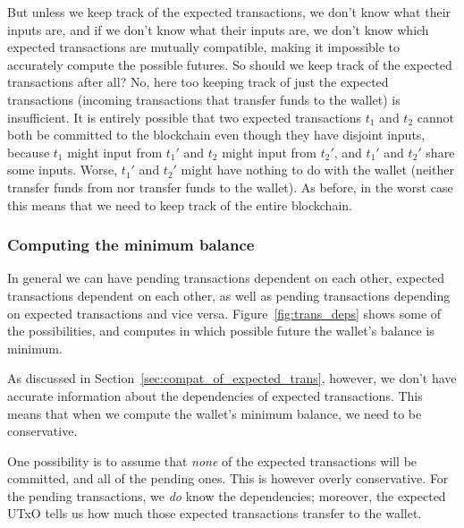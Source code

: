 \documentclass{article}
\begin{document}
But unless we keep track of the expected transactions, we don't know what their
inputs are, and if we don't know what their inputs are, we don't know which
expected transactions are mutually compatible, making it impossible to
accurately compute the possible futures. So should we keep track of the expected
transactions after all? No, here too keeping track of just the expected
transactions (incoming transactions that transfer funds to the wallet) is
insufficient. It is entirely possible that two expected transactions $t_1$ and
$t_2$ cannot both be committed to the blockchain even though they have disjoint
inputs, because $t_1$ might input from $t_1'$ and $t_2$ might input from $t_2'$,
and $t_1'$ and $t_2'$ share some inputs. Worse, $t_1'$ and $t_2'$ might have
nothing to do with the wallet (neither transfer funds from nor transfer funds to
the wallet). As before, in the worst case this means that we need to keep
track of the entire blockchain.

\subsubsection{Computing the minimum balance}

In general we can have pending transactions dependent on each other, expected
transactions dependent on each other, as well as pending transactions depending
on expected transactions and vice versa. Figure~\ref{fig:trans_deps} shows
some of the possibilities, and computes in which possible future the wallet's
balance is minimum.

As discussed in Section~\ref{sec:compat_of_expected_trans}, however, we don't
have accurate information about the dependencies of expected transactions. This
means that when we compute the wallet's minimum balance, we need to be
conservative.

One possibility is to assume that \emph{none} of the expected transactions
will be committed, and all of the pending ones. This is however overly
conservative. For the pending transactions, we \emph{do} know the dependencies;
moreover, the expected UTxO tells us how much those expected transactions
transfer to the wallet.
\end{document}
